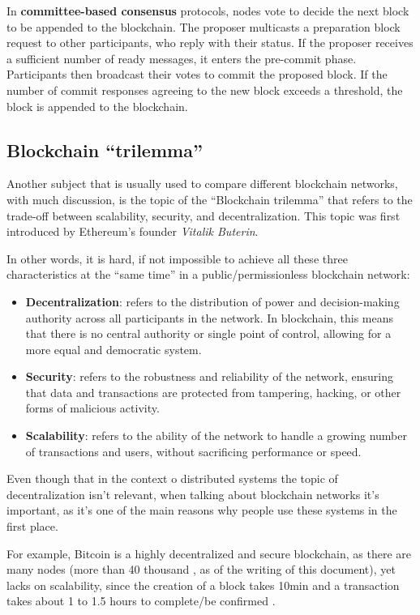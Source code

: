 In \textbf{committee-based consensus} protocols, nodes vote to decide the next block to be appended to the blockchain. The proposer multicasts a preparation block request to other participants, who reply with their status. If the proposer receives a sufficient number of ready messages, it enters the pre-commit phase. Participants then broadcast their votes to commit the proposed block. If the number of commit responses agreeing to the new block exceeds a threshold, the block is appended to the blockchain.

\subsection*{Blockchain ``trilemma''}

Another subject that is usually used to compare different blockchain networks, with much discussion, is the topic of the ``Blockchain trilemma'' \cite{buterin} that refers to the trade-off between scalability, security, and decentralization. 
This topic was first introduced by Ethereum's founder \textit{Vitalik Buterin}.

In other words, it is hard, if not impossible to achieve all these three characteristics at the ``same time'' in a public/permissionless blockchain network:
\begin{itemize}
    \item \textbf{Decentralization}: refers to the distribution of power and decision-making authority across all participants in the network. In blockchain, this means that there is no central authority or single point of control, allowing for a more equal and democratic system.
    \item \textbf{Security}: refers to the robustness and reliability of the network, ensuring that data and transactions are protected from tampering, hacking, or other forms of malicious activity.
    \item \textbf{Scalability}: refers to the ability of the network to handle a growing number of transactions and users, without sacrificing performance or speed.
\end{itemize}

Even though that in the context o distributed systems the topic of decentralization isn't relevant, when talking about blockchain networks it's important, as it's one of the main reasons why people use these systems in the first place.

For example, Bitcoin is a highly decentralized and secure blockchain, as there are many nodes (more than 40 thousand  \cite{bitnodes}, as of the writing of this document), yet lacks on scalability, since the creation of a block takes 10min and a transaction takes about 1 to 1.5 hours to complete/be confirmed \cite{gondek}\label{exampleoftime}.

